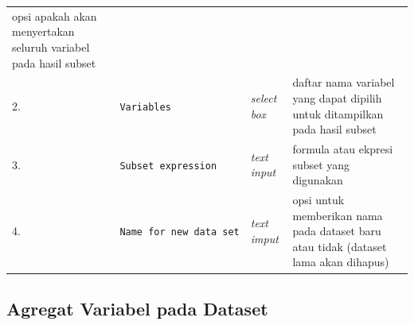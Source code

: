 \documentclass[12pt,]{krantz}
\begin{document}
\begin{longtable}[]{@{}llll@{}}
\begin{minipage}[t]{0.61\columnwidth}
opsi apakah akan menyertakan seluruh variabel pada hasil subset\strut
\end{minipage}\tabularnewline
\begin{minipage}[t]{0.04\columnwidth}\raggedright
2.\strut
\end{minipage} & \begin{minipage}[t]{0.14\columnwidth}\raggedright
\texttt{Variables}\strut
\end{minipage} & \begin{minipage}[t]{0.09\columnwidth}\raggedright
\emph{select box}\strut
\end{minipage} & \begin{minipage}[t]{0.61\columnwidth}\raggedright
daftar nama variabel yang dapat dipilih untuk ditampilkan pada hasil subset\strut
\end{minipage}\tabularnewline
\begin{minipage}[t]{0.04\columnwidth}\raggedright
3.\strut
\end{minipage} & \begin{minipage}[t]{0.14\columnwidth}\raggedright
\texttt{Subset\ expression}\strut
\end{minipage} & \begin{minipage}[t]{0.09\columnwidth}\raggedright
\emph{text input}\strut
\end{minipage} & \begin{minipage}[t]{0.61\columnwidth}\raggedright
formula atau ekpresi subset yang digunakan\strut
\end{minipage}\tabularnewline
\begin{minipage}[t]{0.04\columnwidth}\raggedright
4.\strut
\end{minipage} & \begin{minipage}[t]{0.14\columnwidth}\raggedright
\texttt{Name\ for\ new\ data\ set}\strut
\end{minipage} & \begin{minipage}[t]{0.09\columnwidth}\raggedright
\emph{text imput}\strut
\end{minipage} & \begin{minipage}[t]{0.61\columnwidth}\raggedright
opsi untuk memberikan nama pada dataset baru atau tidak (dataset lama akan dihapus)\strut
\end{minipage}\tabularnewline
\bottomrule
\end{longtable}

\hypertarget{agregat-variabel-pada-dataset}{%
\subsection{Agregat Variabel pada Dataset}\label{agregat-variabel-pada-dataset}}
\end{document}
